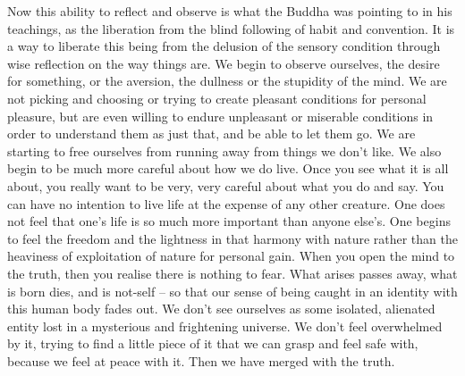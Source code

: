 Now this ability to reflect and observe is what the Buddha was pointing to in his teachings, as the liberation from the blind following of habit and convention. It is a way to liberate this being from the delusion of the sensory condition through wise reflection on the way things are. We begin to observe ourselves, the desire for something, or the aversion, the dullness or the stupidity of the mind. We are not picking and choosing or trying to create pleasant conditions for personal pleasure, but are even willing to endure unpleasant or miserable conditions in order to understand them as just that, and be able to let them go. We are starting to free ourselves from running away from things we don't like. We also begin to be much more careful about how we do live. Once you see what it is all about, you really want to be very, very careful about what you do and say. You can have no intention to live life at the expense of any other creature. One does not feel that one's life is so much more important than anyone else's. One begins to feel the freedom and the lightness in that harmony with nature rather than the heaviness of exploitation of nature for personal gain. When you open the mind to the truth, then you realise there is nothing to fear. What arises passes away, what is born dies, and is not-self -- so that our sense of being caught in an identity with this human body fades out. We don't see ourselves as some isolated, alienated entity lost in a mysterious and frightening universe. We don't feel overwhelmed by it, trying to find a little piece of it that we can grasp and feel safe with, because we feel at peace with it. Then we have merged with the truth.



